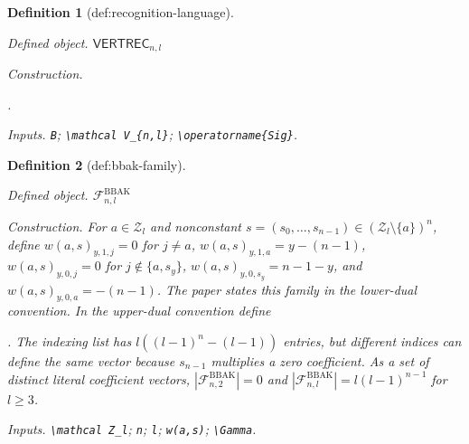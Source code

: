 \documentclass{article}
\newtheorem{definition}{Definition}
\begin{document}
\begin{definition}[def:recognition-language]\label{def:recognition-language}
\par\smallskip\noindent\emph{Defined object.} \(\mathsf{VERTREC}_{n,l}\)
\par\smallskip\noindent\emph{Construction.} \par\noindent {}\par\noindent.
\par\smallskip\noindent\emph{Inputs.} \texttt{B}; \texttt{\textbackslash{}\allowbreak{}mathcal V\_\allowbreak{}\{n,\allowbreak{}l\}\allowbreak{}}; \texttt{\textbackslash{}\allowbreak{}operatorname\{Sig\}\allowbreak{}}.
\end{definition}

\begin{definition}[def:bbak-family]\label{def:bbak-family}
\par\smallskip\noindent\emph{Defined object.} \(\mathcal F^{\mathrm{BBAK}}_{n,l}\)
\par\smallskip\noindent\emph{Construction.} For \(a\in\mathcal Z_l\) and nonconstant \(s=(s_0,\ldots,s_{n-1})\in(\mathcal Z_l\setminus\{a\})^n\), define \(w(a,s)_{y,1,j}=0\) for \(j\ne a\), \(w(a,s)_{y,1,a}=y-(n-1)\), \(w(a,s)_{y,0,j}=0\) for \(j\notin\{a,s_y\}\), \(w(a,s)_{y,0,s_y}=n-1-y\), and \(w(a,s)_{y,0,a}=-(n-1)\). The paper states this family in the lower-dual convention. In the upper-dual convention define \par\noindent {}\par\noindent. The indexing list has \(l((l-1)^n-(l-1))\) entries, but different indices can define the same vector because \(s_{n-1}\) multiplies a zero coefficient. As a set of distinct literal coefficient vectors, \(|\mathcal F^{\mathrm{BBAK}}_{n,2}|=0\) and \(|\mathcal F^{\mathrm{BBAK}}_{n,l}|=l(l-1)^{n-1}\) for \(l\ge3\).
\par\smallskip\noindent\emph{Inputs.} \texttt{\textbackslash{}\allowbreak{}mathcal Z\_\allowbreak{}l}; \texttt{n}; \texttt{l}; \texttt{w(a,\allowbreak{}s)}; \texttt{\textbackslash{}\allowbreak{}Gamma}.
\end{definition}
\end{document}

